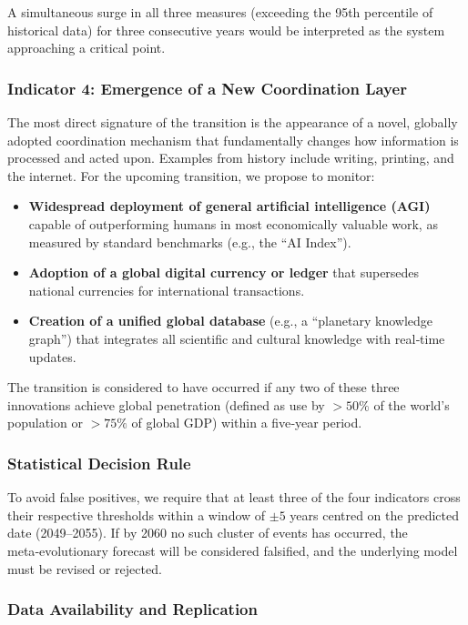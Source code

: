 \documentclass[12pt,a4paper]{article}
\theoremstyle{remark}
\begin{document}
	A simultaneous surge in all three measures (exceeding the 95th percentile of historical data) for three consecutive years would be interpreted as the system approaching a critical point.
	
	\subsubsection{Indicator 4: Emergence of a New Coordination Layer}
	
	The most direct signature of the transition is the appearance of a novel, globally adopted coordination mechanism that fundamentally changes how information is processed and acted upon. Examples from history include writing, printing, and the internet. For the upcoming transition, we propose to monitor:
	
	\begin{itemize}
		\item \textbf{Widespread deployment of general artificial intelligence (AGI)} capable of outperforming humans in most economically valuable work, as measured by standard benchmarks (e.g., the “AI Index”).
		\item \textbf{Adoption of a global digital currency or ledger} that supersedes national currencies for international transactions.
		\item \textbf{Creation of a unified global database} (e.g., a “planetary knowledge graph”) that integrates all scientific and cultural knowledge with real‑time updates.
	\end{itemize}
	
	The transition is considered to have occurred if any two of these three innovations achieve global penetration (defined as use by \(>50\%\) of the world’s population or \(>75\%\) of global GDP) within a five‑year period.
	
	\subsubsection{Statistical Decision Rule}
	
	To avoid false positives, we require that at least three of the four indicators cross their respective thresholds within a window of \(\pm 5\) years centred on the predicted date (2049–2055). If by 2060 no such cluster of events has occurred, the meta‑evolutionary forecast will be considered falsified, and the underlying model must be revised or rejected.
	
	\subsubsection{Data Availability and Replication}
	
\end{document}

